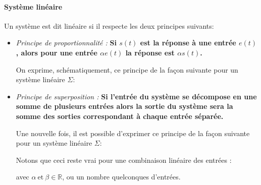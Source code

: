 \paragraph{Système linéaire}
Un système est dit linéaire si il respecte les deux principes suivants:
\begin{itemize}
    \item \emph{Principe de proportionnalité :}
        \textbf{Si $s(t)$ est la réponse à une entrée $e(t)$, alors 
        pour une entrée $\alpha e(t)$ la réponse est $\alpha s(t)$.}
        
        On exprime, schématiquement, ce principe de la façon suivante pour 
        un système linéaire $\Sigma$:
        \begin{center}
            
        \end{center}

    \item \emph{Principe de superposition :}
        \textbf{Si l'entrée du système se décompose en une somme 
        de plusieurs entrées alors la sortie du système sera la somme des 
        sorties correspondant à chaque entrée séparée.}

        Une nouvelle fois, il est possible d'exprimer ce principe de la façon 
        suivante pour un système linéaire $\Sigma$:
        \begin{center}
            
        \end{center}
        Notons que ceci reste vrai pour une combinaison linéaire des entrées :
        \begin{center}
            
        \end{center}
        avec $\alpha\ \text{et}\ \beta\in\mathbb{R}$, ou un nombre quelconques 
        d'entrées.
\end{itemize}
